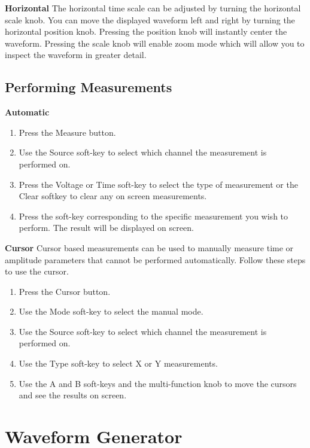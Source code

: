 \textbf{Horizontal}
The horizontal time scale can be adjusted by turning the horizontal scale knob. You can move the displayed waveform left and right by turning the horizontal position knob. Pressing the position knob will instantly center the waveform. Pressing the scale knob will enable zoom mode which will allow you to inspect the waveform in greater detail.
\subsection{Performing Measurements}
\textbf{Automatic}
\begin{enumerate}
\item Press the Measure button.
\item Use the Source soft-key to select which channel the measurement is performed on.
\item Press the Voltage or Time soft-key to select the type of measurement or the Clear softkey to clear any on screen measurements.
\item Press the soft-key corresponding to the specific measurement you wish to perform. The result will be displayed on screen.
\end{enumerate}
\textbf{Cursor}
Cursor based measurements can be used to manually measure time or amplitude parameters that cannot be performed automatically.  Follow these steps to use the cursor.
\begin{enumerate}
\item Press the Cursor button.
\item Use the Mode soft-key to select the manual mode.
\item Use the Source soft-key to select which channel the measurement is performed on.
\item Use the Type soft-key to select X or Y measurements.
\item Use the A and B soft-keys and the multi-function knob to move the cursors and see the results on screen.
\end{enumerate}
\section{Waveform Generator}
